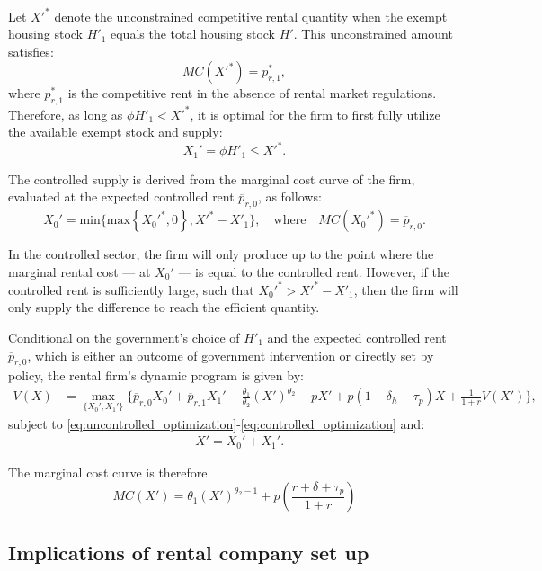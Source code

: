 \documentclass[parskip=full]{article}
\begin{document}
Let $X'^{*}$ denote the unconstrained competitive rental quantity when the exempt housing stock $H'_1$ equals the total housing stock $H'$. This unconstrained amount satisfies: \[MC(X'^{*}) = p^{*}_{r,1},\] where $p^{*}_{r,1}$ is the competitive rent in the absence of rental market regulations. Therefore, as long as $\phi H'_1<X'^{*}$, it is optimal for the firm to first fully utilize the available exempt stock and supply:
\begin{equation}\label{eq:uncontrolled_optimization}
X_1'=\phi H'_1\leq X'^{*}.  
\end{equation}

The controlled supply is derived from the marginal cost curve of the firm, evaluated at the expected controlled rent $\overline{p}_{r,0}$, as follows: 
\begin{equation}\label{eq:controlled_optimization}
X_0'=\mbox{min}\{\text{max}\left\{X_0'^*,0\right\},X'^*-X'_1\}, \quad
\text{where}\quad MC(X_0'^*)=\overline{p}_{r,0}.    
\end{equation}

\noindent In the controlled sector, the firm will only produce up to the point where the marginal rental cost — at $X_0'$ — is equal to the controlled rent. However, if the controlled rent is sufficiently large, such that $X_0'^*>X'^*-X'_1$, then the firm will only supply the difference to reach the efficient quantity.

Conditional on the government’s choice of $H'_1$ and the expected controlled rent $\overline{p}_{r,0}$, which is either an outcome of government intervention or directly set by policy, the rental firm’s dynamic program is given by:
\begin{align}\label{eq:rental_optimization}
V(X) &= \max_{\{X_0',X_1'\}} \Big\{\overline{p}_{r,0}X_0'+\overline{p}_{r,1} X_1'-\frac{\theta_1}{\theta_2}(X')^{\theta_2}-p X'+p(1-\delta_h-\tau_p)X+\frac{1}{1+r} V(X')\Big\},
\end{align}
\noindent subject to \eqref{eq:uncontrolled_optimization}-\eqref{eq:controlled_optimization} and:
\begin{align}
& X'=X_0'+X_1'. \label{eq:total_supply_def}
\end{align}

\noindent The marginal cost curve is therefore \[MC(X')=\theta_1(X')^{\theta_2-1}+p\left(\frac{r+\delta+\tau_p}{1+r}\right)\]

\subsection{Implications of rental company set up}
\end{document}
